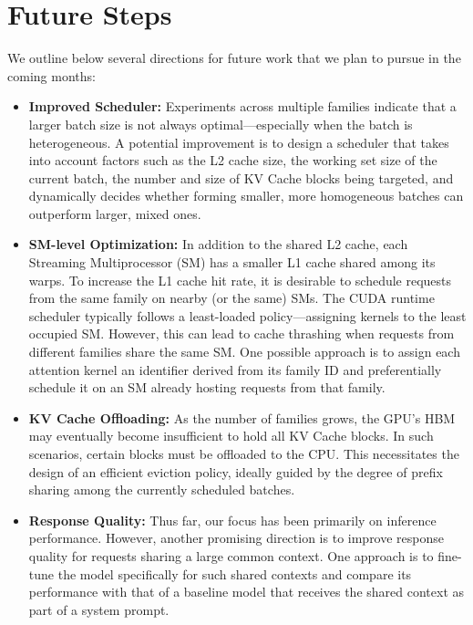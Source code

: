 \chapter{Future Steps}
\label{ch:future_steps}
We outline below several directions for future work that we plan to pursue in the coming months:
\begin{itemize}
\item \textbf{Improved Scheduler:} Experiments across multiple families indicate that a larger batch size is not always optimal—especially when the batch is heterogeneous. A potential improvement is to design a scheduler that takes into account factors such as the L2 cache size, the working set size of the current batch, the number and size of KV Cache blocks being targeted, and dynamically decides whether forming smaller, more homogeneous batches can outperform larger, mixed ones.
\item \textbf{SM-level Optimization:} In addition to the shared L2 cache, each Streaming Multiprocessor (SM) has a smaller L1 cache shared among its warps. To increase the L1 cache hit rate, it is desirable to schedule requests from the same family on nearby (or the same) SMs. The CUDA runtime scheduler typically follows a least-loaded policy—assigning kernels to the least occupied SM. However, this can lead to cache thrashing when requests from different families share the same SM. One possible approach is to assign each attention kernel an identifier derived from its family ID and preferentially schedule it on an SM already hosting requests from that family.
\item \textbf{KV Cache Offloading:} As the number of families grows, the GPU's HBM may eventually become insufficient to hold all KV Cache blocks. In such scenarios, certain blocks must be offloaded to the CPU. This necessitates the design of an efficient eviction policy, ideally guided by the degree of prefix sharing among the currently scheduled batches.
\item \textbf{Response Quality:} Thus far, our focus has been primarily on inference performance. However, another promising direction is to improve response quality for requests sharing a large common context. One approach is to fine-tune the model specifically for such shared contexts and compare its performance with that of a baseline model that receives the shared context as part of a system prompt.
\end{itemize}